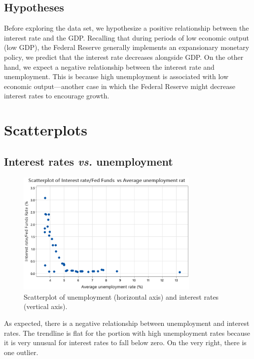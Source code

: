 \documentclass[12pt]{article}
\begin{document}
\subsection{Hypotheses}
Before exploring the data set, we hypothesize a positive relationship between the interest rate and the GDP. Recalling that during periods of low economic output (low GDP), the Federal Reserve generally implements an expansionary monetary policy, we predict that the interest rate decreases alongside GDP. On the other hand, we expect a negative relationship between the interest rate and unemployment. This is because high unemployment is associated with low economic output---another case in which the Federal Reserve might decrease interest rates to encourage growth.

\section{Scatterplots}
\label{sec:scatterplot}
\subsection{Interest rates \textit{vs.} unemployment}
\begin{figure}
\begin{center}
\includegraphics[width=3.5in]{images/unemployment-scatterplot.png}
\end{center}
\caption{Scatterplot of unemployment (horizontal axis) and interest rates (vertical axis). \label{fig:unemploymentscatterplot}}
\end{figure}
As expected, there is a negative relationship between unemployment and interest rates. The trendline is flat for the portion with high unemployment rates because it is very unusual for interest rates to fall below zero. On the very right, there is one outlier.
\end{document}
